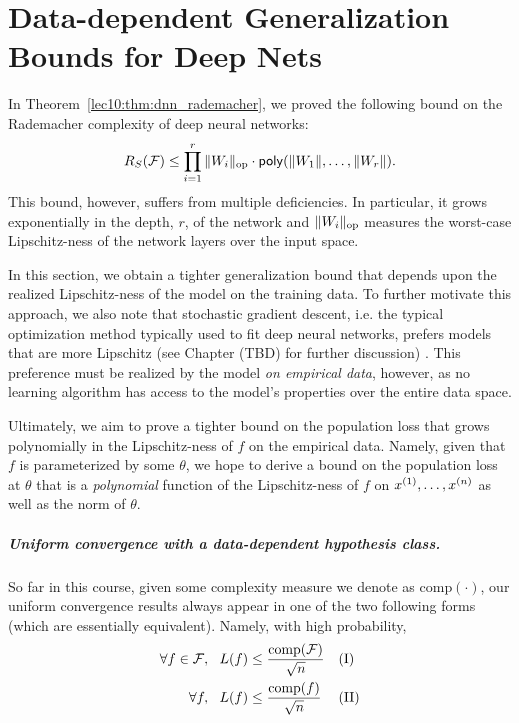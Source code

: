\chapter{Data-dependent Generalization Bounds for Deep Nets}\label{sec:deep_nets_data_dependent}

In Theorem~\ref{lec10:thm:dnn_rademacher}, we proved the following bound on the Rademacher complexity of deep neural networks:
\begin{align}
    R_S(\cF) \leq \prod_{i = 1}^r \norm{W_i}_{\text{op}} \cdot \mathsf{poly}(\norm{W_1}, \dots, \norm{W_r}).
\end{align}
This bound, however, suffers from multiple deficiencies. In particular, it grows exponentially in the depth, $r$, of the network and $\norm{W_i}_{\text{op}}$ measures the worst-case Lipschitz-ness of the network layers over the input space. %

In this section, we obtain a tighter generalization bound that depends upon the realized Lipschitz-ness of the model on the training data. To further motivate this approach, we also note that stochastic gradient descent, i.e. the typical optimization method typically used to fit deep neural networks, prefers models that are more Lipschitz (see Chapter (TBD) for further discussion) . This preference must be realized by the model \emph{on empirical data}, however, as no learning algorithm has access to the model's properties over the entire data space.

Ultimately, we aim to prove a tighter bound on the population loss that grows polynomially in the Lipschitz-ness of $f$ on the empirical data. Namely, given that $f$ is parameterized by some $\theta$, we hope to derive a bound on the population loss at $\theta$ that is a \emph{polynomial} function of the Lipschitz-ness of $f$ on $x\sp{1},\dots,x\sp{n}$ as well as the norm of $\theta$.

\paragraph{Uniform convergence with a data-dependent hypothesis class.}
So far in this course, given some complexity measure we denote as $\text{comp}(\cdot)$, our uniform convergence results always appear in one of the two following forms (which are essentially equivalent). Namely, with high probability,
\begin{align}
\forall f\in \cF, ~~L(f) &\leq \frac{\text{comp}(\cF)}{\sqrt{n}} &&\text{(I)} \\
\forall f, ~~ L(f) &\leq \frac{\text{comp}(f)}{\sqrt{n}}  &&\text{(II)}
\end{align}

